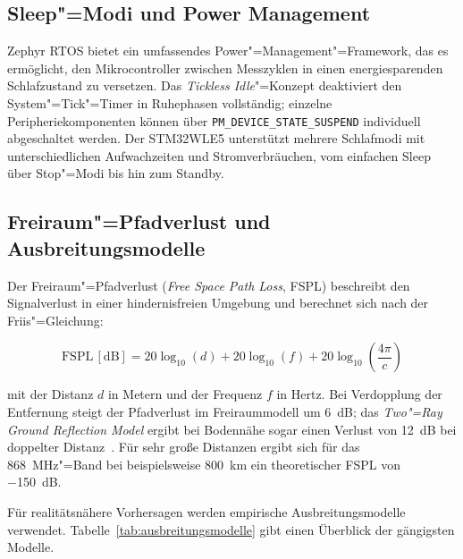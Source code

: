 \subsection{Sleep"=Modi und Power Management}
\label{subsec:sleep}

Zephyr RTOS bietet ein umfassendes Power"=Management"=Framework, das es ermöglicht,
den Mikrocontroller zwischen Messzyklen in einen energiesparenden Schlafzustand zu
versetzen. Das \textit{Tickless Idle}"=Konzept deaktiviert den System"=Tick"=Timer
in Ruhephasen vollständig; einzelne Peripheriekomponenten können über
\texttt{PM\_DEVICE\_STATE\_SUSPEND} individuell abgeschaltet werden. Der STM32WLE5
unterstützt mehrere Schlafmodi mit unterschiedlichen Aufwachzeiten und
Stromverbräuchen, vom einfachen Sleep über Stop"=Modi bis hin zum Standby.

\subsection{Freiraum"=Pfadverlust und Ausbreitungsmodelle}
\label{subsec:pfadverlust}

Der Freiraum"=Pfadverlust (\textit{Free Space Path Loss}, FSPL) beschreibt den
Signalverlust in einer hindernisfreien Umgebung und berechnet sich nach der
Friis"=Gleichung:

\begin{equation}
  \text{FSPL} \, [\si{\dB}] = 20 \log_{10}(d) + 20 \log_{10}(f)
                              + 20 \log_{10}\!\left(\frac{4\pi}{c}\right)
  \label{eq:fspl}
\end{equation}

mit der Distanz $d$ in Metern und der Frequenz $f$ in Hertz. Bei Verdopplung der
Entfernung steigt der Pfadverlust im Freiraummodell um \SI{6}{\dB}; das
\textit{Two"=Ray Ground Reflection Model} ergibt bei Bodennähe sogar einen Verlust
von \SI{12}{\dB} bei doppelter Distanz~\cite{dobkin2012rf}. Für sehr große Distanzen
ergibt sich für das \SI{868}{\MHz}"=Band bei beispielsweise \SI{800}{\km} ein
theoretischer FSPL von \SI{-150}{\dB}.

Für realitätsnähere Vorhersagen werden empirische Ausbreitungsmodelle verwendet.
Tabelle~\ref{tab:ausbreitungsmodelle} gibt einen Überblick der gängigsten Modelle.

